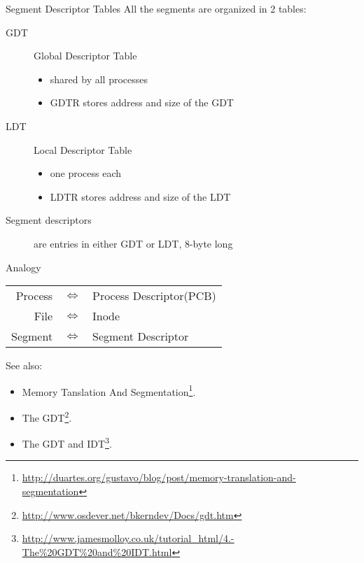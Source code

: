 \begin{frame}{Segment Descriptor Tables}
    All the segments are organized in 2 tables:
    \begin{description}
    \item[GDT] \alert{Global Descriptor Table}
      \begin{itemize}
      \item shared by all processes
      \item GDTR stores address and size of the GDT
      \end{itemize}
    \item[LDT] \alert{Local Descriptor Table}
      \begin{itemize}
      \item one process each
      \item LDTR stores address and size of the LDT
      \end{itemize}
    \item[Segment descriptors] are entries in either GDT or LDT, 8-byte long
    \end{description}
      \begin{block}{Analogy}
        \begin{center}
          \begin{tabular}{rcl}
            Process&$\Longleftrightarrow$&Process Descriptor(PCB)\\
            File&$\Longleftrightarrow$&Inode\\
            Segment&$\Longleftrightarrow$&Segment Descriptor
          \end{tabular}
        \end{center}
      \end{block}
\end{frame}

See also:
\begin{itemize}
\item Memory Tanslation And Segmentation\footnote{\url{http://duartes.org/gustavo/blog/post/memory-translation-and-segmentation}}.
\item The GDT\footnote{\url{http://www.osdever.net/bkerndev/Docs/gdt.htm}}.
\item The GDT and IDT\footnote{\url{http://www.jamesmolloy.co.uk/tutorial_html/4.-The\%20GDT\%20and\%20IDT.html}}.
\end{itemize}

